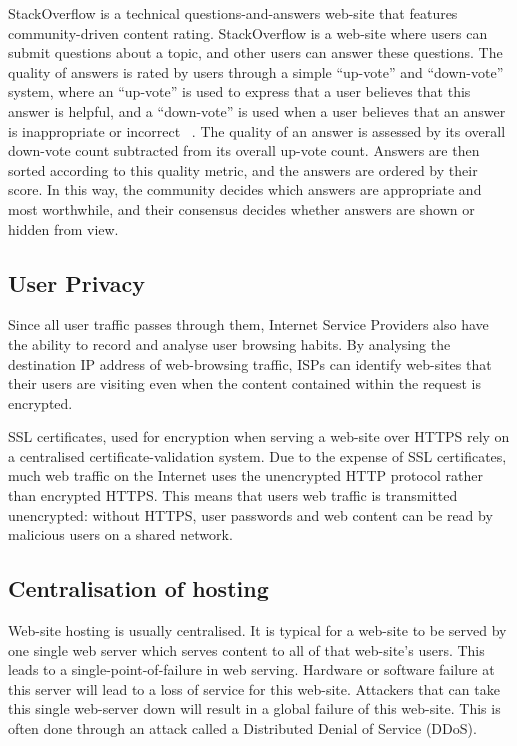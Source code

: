 StackOverflow is a technical questions-and-answers web-site that features
community-driven content rating. StackOverflow is a web-site where users can submit
questions about a topic, and other users can answer these questions. The quality
of answers is rated by users through a simple ``up-vote'' and ``down-vote'' system, where an
``up-vote'' is used to express that a user believes that this answer is helpful,
and a ``down-vote'' is used when a user believes that an answer is inappropriate or incorrect
~\cite{stackoverflow}.
The quality of an answer is assessed by its overall down-vote count subtracted
from its overall up-vote count. Answers are then sorted according to this
quality metric, and the answers are ordered by their score. In this way, the
community decides which answers are appropriate and most worthwhile, and their
consensus decides whether answers are shown or hidden from view.

\subsection{User Privacy}

Since all user traffic passes through them, Internet Service Providers also have
the ability to record and analyse user browsing habits. By analysing the destination
IP address of web-browsing traffic, ISPs can identify web-sites
that their users are visiting even when the content contained within the request is
encrypted.

SSL certificates, used for encryption when serving a web-site over HTTPS rely on a
centralised certificate-validation system. Due to the expense of SSL certificates,
much web traffic on the Internet uses the unencrypted HTTP protocol rather than
encrypted HTTPS. This means that users web traffic is transmitted unencrypted: without
HTTPS, user passwords and web content can be read by malicious users on a shared network.

\subsection{Centralisation of hosting}

Web-site hosting is usually centralised. It is typical for a web-site to be served by
one single web server which serves content to all of that web-site's users. This leads
to a single-point-of-failure in web serving. Hardware or software failure at this server
will lead to a loss of service for this web-site. Attackers that can take this single web-server
down will result in a global failure of this web-site. This is often done through an attack
called a Distributed Denial of Service (DDoS).

